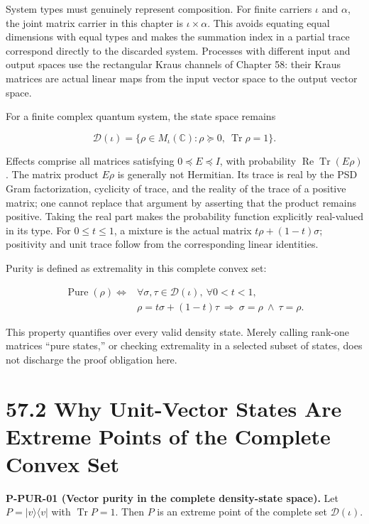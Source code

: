 \documentclass[
  11pt,
  oneside]{book}
\begin{document}
System types must genuinely represent composition. For finite carriers
\(\iota\) and \(\alpha\), the joint matrix carrier in this chapter is
\(\iota\times\alpha\). This avoids equating equal dimensions with equal
types and makes the summation index in a partial trace correspond
directly to the discarded system. Processes with different input and
output spaces use the rectangular Kraus channels of Chapter 58: their
Kraus matrices are actual linear maps from the input vector space to the
output vector space.

For a finite complex quantum system, the state space remains

\[
\mathcal D(\iota)=\{\rho\in M_\iota(\mathbb C):\rho\succeq0,\ \operatorname{Tr}\rho=1\}.
\]

Effects comprise all matrices satisfying \(0\preceq E\preceq I\), with
probability \(\operatorname{Re}\operatorname{Tr}(E\rho)\). The matrix
product \(E\rho\) is generally not Hermitian. Its trace is real by the
PSD Gram factorization, cyclicity of trace, and the reality of the trace
of a positive matrix; one cannot replace that argument by asserting that
the product remains positive. Taking the real part makes the probability
function explicitly real-valued in its type. For \(0\le t\le1\), a
mixture is the actual matrix \(t\rho+(1-t)\sigma\); positivity and unit
trace follow from the corresponding linear identities.

Purity is defined as extremality in this complete convex set:

\[
\begin{aligned}
\operatorname{Pure}(\rho)\iff{}&
\forall\sigma,\tau\in\mathcal D(\iota),\ \forall 0<t<1,\\
&\rho=t\sigma+(1-t)\tau
\ \Longrightarrow\ \sigma=\rho\ \land\ \tau=\rho.
\end{aligned}
\]

This property quantifies over every valid density state. Merely calling
rank-one matrices ``pure states,'' or checking extremality in a selected
subset of states, does not discharge the proof obligation here.

\section{57.2 Why Unit-Vector States Are Extreme Points of the Complete
Convex Set}

\label{p-pur-01}{}

\textbf{P-PUR-01 (Vector purity in the complete density-state space).}
Let \(P=|v\rangle\langle v|\) with \(\operatorname{Tr}P=1\). Then \(P\)
is an extreme point of the complete set \(\mathcal D(\iota)\).
\end{document}
